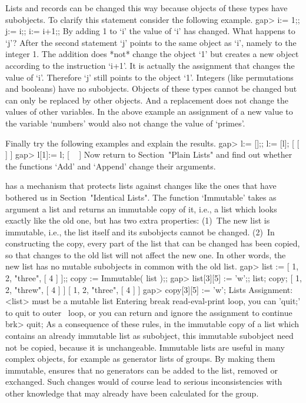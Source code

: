 Lists and records can be changed this way because {\GAP} objects of these
types have subobjects.
To clarify this statement consider the following example.
\beginexample
gap> i:= 1;; j:= i;; i:= i+1;; 
\endexample
By adding 1 to `i' the value of `i' has  changed.   What  happens to `j'?
After the second statement `j' points to the same object  as `i',  namely
to the  integer 1.  The  addition  does *not* change  the object `1'  but
creates a new object according  to the instruction `i+1'.  It is actually
the assignment that changes the value of `i'.  Therefore `j' still points
to  the object `1'.  Integers  (like permutations and  booleans)  have no
subobjects.  Objects  of these types  cannot  be  changed but can only be
replaced by other objects.   And a replacement does not change the values
of other variables.  In the above example an assignment of a new value to
the variable `numbers' would also not change the value of `primes'.

Finally try the following examples and explain the results.
\beginexample
gap> l:= [];; l:= [l];
[ [  ] ]
gap> l[1]:= l;
[ ~ ]
\endexample
Now return to Section~"Plain Lists" and find out whether the functions
`Add' and `Append' change their arguments.


{\GAP} has a mechanism that protects lists against  changes like the ones
that have bothered   us in    Section~"Identical Lists". The     function
`Immutable' takes as argument a list and returns an immutable copy of it,
i.e., a list  which  looks exactly like the   old one, but has  two extra
properties:
(1)~The new list is immutable, i.e.,  the list itself and its subobjects 
    cannot be changed.
(2)~In constructing the copy, every part of  the list that can be changed
    has been copied, so that changes to the  old list will not affect the
    new one.  In other words, the new  list has no  mutable subobjects in
    common with the old list.
\begintt
gap> list := [ 1, 2, "three", [ 4 ] ];; copy := Immutable( list );;
gap> list[3][5] := 'w';; list; copy;
[ 1, 2, "threw", [ 4 ] ]
[ 1, 2, "three", [ 4 ] ]
gap> copy[3][5] := 'w';
Lists Assignment: <list> must be a mutable list
Entering break read-eval-print loop, you can 'quit;' to quit to outer \
loop,
or you can return and ignore the assignment to continue
brk> quit;
\endtt
As a consequence of  these rules, in the  immutable copy of a list  which
contains an already immutable list as subobject, this immutable subobject
need not be copied,  because it is unchangeable. Immutable lists are
useful in many complex {\GAP} objects,  for example as generator lists of
groups. By  making them immutable, {\GAP}  ensures that no generators can
be added to the list, removed or exchanged. Such  changes would of course
lead  to serious inconsistencies with  other  knowledge that may already
have been calculated for the group.

